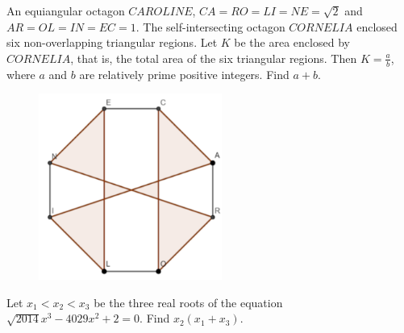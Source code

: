 \begin{section-problem}
    An equiangular octagon $CAROLINE$, $CA = RO = LI = NE = \sqrt {2}$ and $AR = OL = IN = EC = 1$.
    The self-intersecting octagon $CORNELIA$ enclosed six non-overlapping triangular regions.
    Let $K$ be the area enclosed by $CORNELIA$, that is, the total area of the six triangular regions.
    Then $K = \frac{a}{b}$, where $a$ and $b$ are relatively prime positive integers.
    Find $a + b$.
    \begin{figure}[htb]
        \centering
        \includegraphics[width=6cm]{images/problem 6}
    \end{figure}
\end{section-problem}

\begin{section-problem}
    Let $x_1 < x_2 < x_3$ be the three real roots of the equation $\sqrt {2014} x^3 - 4029 x^2 + 2 = 0$.
    Find $x_2\left(x_1 + x_3\right)$.
\end{section-problem}